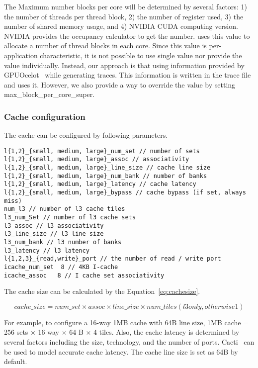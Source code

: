 The Maximum number blocks per core will be determined by several
factors: 1) the number of threads per thread block, 2) the number of
register used, 3) the number of shared memory usage, and 4) NVIDIA
CUDA computing version. NVIDIA provides the occupancy calculator to
get the number. \SIM uses this value to allocate a number of thread
blocks in each core. Since this value is per-application
characteristic, it is not possible to use single value nor provide the
value individually. Instead, our approach is that using information
provided by GPUOcelot~\cite{ocelot} while generating traces. This
information is written in the trace file and \SIM uses it. However, we
also provide a way to override the value by
setting \textsf{max\_block\_per\_core\_super}.



\subsubsection{Cache configuration}

The cache can be configured by following parameters.

\smallskip
\begin{lstlisting}
l{1,2}_{small, medium, large}_num_set // number of sets
l{1,2}_{small, medium, large}_assoc // associativity
l{1,2}_{small, medium, large}_line_size // cache line size
l{1,2}_{small, medium, large}_num_bank // number of banks  
l{1,2}_{small, medium, large}_latency // cache latency
l{1,2}_{small, medium, large}_bypass // cache bypass (if set, always miss)
num_l3 // number of l3 cache tiles
l3_num_Set // number of l3 cache sets
l3_assoc // l3 associativity
l3_line_size // l3 line size
l3_num_bank // l3 number of banks
l3_latency // l3 latency
l{1,2,3}_{read,write}_port // the number of read / write port
icache_num_set  8 // 4KB I-cache 
icache_assoc   8 // I cache set associativity 
\end{lstlisting}
\smallskip

The cache size can be calculated by the Equation~\ref{eq:cachesize}.

\begin{equation}
\label{eq:cachesize}
cache\_size = num\_set \times assoc \times line\_size \times num\_tiles (l3 only, otherwise 1)
\end{equation}

For example, to configure a 16-way 1MB cache with 64B line
size, \textsf{1MB cache} = \textsf{256 sets} $\times$ \textsf{16 way}
$\times$ \textsf{64 B} $\times$ \textsf{4 tiles}. Also, the cache
latency is determined by several factors including the size,
technology, and the number of ports. Cacti~\cite{cacti} can be used to
model accurate cache latency. The cache line size is set as 64B by default. 


